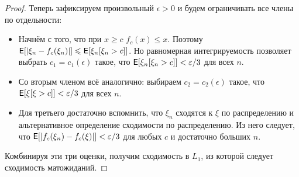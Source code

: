\begin{proof}
    Теперь зафиксируем произвольный $\epsilon > 0$ и будем ограничивать все члены по отдельности:
    \begin{itemize}
        \item Начнём с того, что при $x \geq c$ $f_{c}(x) \leq x$. Поэтому $\operatorname{\mathsf{E}}[|\xi_{n} - f_{c}(\xi_{n})|] \leqslant \operatorname{\mathsf{E}}[\xi_{n}[\xi_{n} > c]]$. Но равномерная интегрируемость позволяет выбрать $c_{1} = c_{1}(\epsilon)$ такое, что $\operatorname{\mathsf{E}}[\xi_{n}[\xi_{n} > c]] < \varepsilon/3$ для всех $n$.
        \item Со вторым членом всё аналогично: выбираем $c_{2} = c_{2}(\epsilon)$ такое, что $\operatorname{\mathsf{E}}[\xi[\xi > c]] < \varepsilon/3$ для всех $n$.
        \item Для третьего достаточно вспомнить, что $\xi_{n}$ сходятся к $\xi$ по распределению и альтернативное определение сходимости по распределению. Из него следует, что $\operatorname{\mathsf{E}}[|f_{c}(\xi_{n}) - f_{c}(\xi)|] < \varepsilon/3$ для любых $c$ и достаточно больших $n$.
    \end{itemize}
    Комбинируя эти три оценки, получим сходимость в $L_{1}$, из которой следует сходимость матожиданий.
\end{proof}

